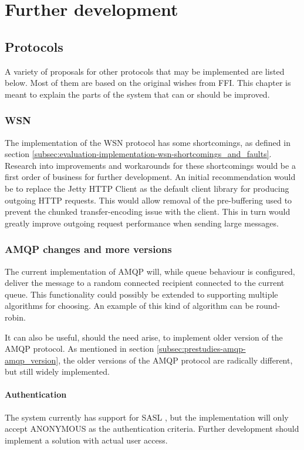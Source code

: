 
\chapter{Further development}

\section{Protocols}
A variety of proposals for other protocols that may be implemented are listed below. Most of them are based on the original wishes from FFI. This chapter is meant to explain the parts of the system that can or should be improved.

\subsection{WSN}
The implementation of the WSN protocol has some shortcomings, as defined in section \ref{subsec:evaluation-implementation-wsn-shortcomings_and_faults}. Research into improvements and workarounds for these shortcomings would be a first order of business for further development. An initial recommendation would be to replace the Jetty HTTP Client as the default client library for producing outgoing HTTP requests. This would allow removal of the pre-buffering used to prevent the chunked transfer-encoding issue with the client. This in turn would greatly improve outgoing request performance when sending large messages.

\subsection{AMQP changes and more versions}
The current implementation of AMQP will, while queue behaviour is configured, deliver the message to a random connected recipient connected to the current queue. This functionality could possibly be extended to supporting multiple algorithms for choosing. An example of this kind of algorithm can be round-robin.

It can also be useful, should the need arise, to implement older version of the AMQP protocol. As mentioned in section \ref{subsec:prestudies-amqp-amqp_version}, the older versions of the AMQP protocol are radically different, but still widely implemented.

\subsubsection{Authentication}
The system currently has support for SASL \cite{sasl}, but the implementation will only accept ANONYMOUS as the authentication criteria. Further development should implement a solution with actual user access. 


